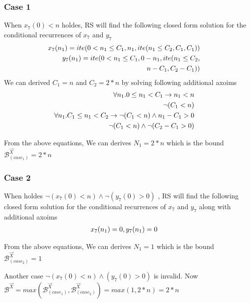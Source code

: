 \subsubsection{Case 1} When $x_7(0)<n$ holdes, RS will find the following closed form solution for the conditional recurrences of $x_7$ and $y_7$ 
\begin{eqnarray*}
	&&\hspace*{-2em}x_7(n_1)=ite(0<n_1\leq C_1,n_1,ite(n_1\leq C_2,C_1,C_1))\\
	&&\hspace*{-2em}y_7(n_1)=ite(0<n_1\leq C_1,0-n_1,ite(n_1 \leq C_2,\\
	&&\hspace*{5em}n-C_1,C_2-C_1))
\end{eqnarray*}	
We can derived $C_1=n$ and $C_2=2*n$ by solving following additional axoims
\begin{eqnarray*}
	&&\hspace*{-2em}\forall n_1. 0 \leq n_1<C_1 \rightarrow n_1<n \\
	&&\hspace*{-2em}\neg (C_1 < n)\\
	&&\hspace*{-2em}\forall n_1. C_1 \leq n_1<C_2 \rightarrow \neg (C_1 < n) \land n_1-C_1 > 0\\
	&&\hspace*{-2em}\neg (C_1 < n) \land \neg (C_2-C_1 > 0)
\end{eqnarray*}

From the above equations, We can derives $N_1=2*n$ which is the bound $\mathcal{B}^{\vec{X}}_{(case_1)}=2*n$


\subsubsection{Case 2} When holdes $\neg (x_7(0)<n) \wedge \neg (y_7(0)>0)$ , RS will find the following closed form solution for the conditional recurrences of $x_7$ and $y_7$ along with additional axoims
\begin{eqnarray*}
	&&\hspace*{-2em}x_7(n_1)=0, y_7(n_1)=0
\end{eqnarray*}

From the above equations, We can derives $N_1=1$ which is the bound $\mathcal{B}^{\vec{X}}_{(case_2)}=1$

Another case $\neg (x_7(0)<n) \wedge (y_7(0)>0)$ is invalid. Now $\mathcal{B}^{\vec{X}}=max(\mathcal{B}^{\vec{X}}_{(case_1)},\mathcal{B}^{\vec{X}}_{(case_2)})=max(1,2*n)=2*n$

